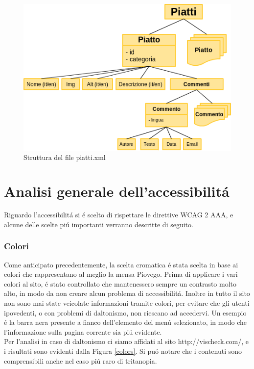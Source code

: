 \documentclass[10pt,a4paper,onecolumn]{article}
\begin{document}
\begin{figure}[h]
\centering
\includegraphics[scale=0.55]{alberoXML}
\caption{Struttura del file piatti.xml}
\label{xml}
\end{figure}

\section{Analisi generale dell'accessibilit\'a}

Riguardo l'accessibilit\'a si \'e scelto di rispettare le direttive WCAG 2 AAA, e alcune delle scelte pi\'u importanti verranno descritte di seguito.

\subsubsection{Colori}

Come anticipato precedentemente, la scelta cromatica \'e stata scelta in base ai colori che rappresentano al meglio la mensa Piovego. Prima di applicare i vari colori al sito, \'e stato controllato che mantenessero sempre un contrasto molto alto, in modo da non creare alcun problema di accessibilit\'a. Inoltre in tutto il sito non sono mai state veicolate informazioni tramite colori, per evitare che gli utenti ipovedenti, o con problemi di daltonismo, non riescano ad accedervi. Un esempio \'e la barra nera presente a fianco dell'elemento del men\'u selezionato, in modo che l'informazione sulla pagina corrente sia pi\'u evidente. \\
Per l'analisi in caso di daltonismo ci siamo affidati al sito http://vischeck.com/, e i risultati sono evidenti dalla Figura \ref{colors}. Si pu\'o notare che i contenuti sono comprensibili anche nel caso pi\'u raro di tritanopia. \\
\end{document}
